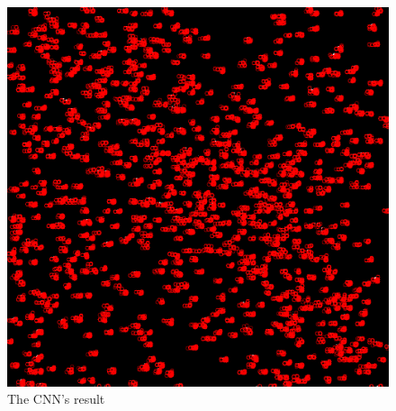 \begin{figure}
	\centerline{\includegraphics[width=\locateimgsize]{images/locate/cnn.png}}
	\caption{\centering The CNN's result}
	\label{fig:locate:cnn}
\end{figure}
